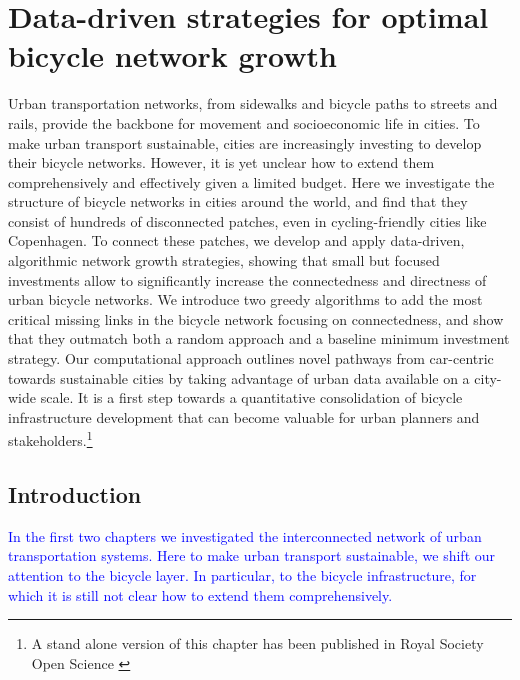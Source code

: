 \chapter{Data-driven strategies for optimal bicycle network growth}\label{ch:BikeGrowth}

Urban transportation networks, from sidewalks and bicycle paths to streets and rails, provide the backbone for movement and socioeconomic life in cities. To make urban transport sustainable, cities are increasingly investing to develop their bicycle networks. However, it is yet unclear how to extend them comprehensively and effectively given a limited budget. Here we investigate the structure of bicycle networks in cities around the world, and find that they consist of hundreds of disconnected patches, even in cycling-friendly cities like Copenhagen. To connect these patches, we develop and apply data-driven, algorithmic network growth strategies, showing that small but focused investments allow to significantly increase the connectedness and directness of urban bicycle networks. We introduce two greedy algorithms to add the most critical missing links in the bicycle network focusing on connectedness, and show that they outmatch both a random approach and a baseline minimum investment strategy. Our computational approach outlines novel pathways from car-centric towards sustainable cities by taking advantage of urban data available on a city-wide scale. It is a first step towards a quantitative consolidation of bicycle infrastructure development that can become valuable for urban planners and stakeholders.\footnote{A stand alone version of this chapter has been published in Royal Society Open Science \cite{natera2020growth}}
\pagebreak

\section{Introduction}
\textcolor{blue}{In the first two chapters we investigated the interconnected network of urban transportation systems. Here to make urban transport sustainable, we shift our attention to the bicycle layer. In particular, to the bicycle infrastructure, for which it is still not clear how to extend them comprehensively.}

